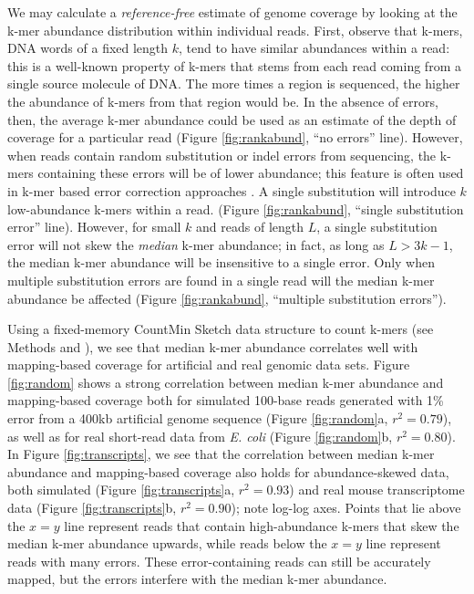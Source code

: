 \documentclass[10pt]{article}
\begin{document}
We may calculate a {\em reference-free} estimate of genome coverage by
looking at the k-mer abundance distribution within individual reads.
First, observe that k-mers, DNA words of a fixed length $k$, tend to
have similar abundances within a read: this is a well-known property
of k-mers that stems from each read coming from a single source
molecule of DNA.  The more times a region is sequenced, the higher the
abundance of k-mers from that region would be.  In the absence of
errors, then, the average k-mer abundance could be used as an estimate
of the depth of coverage for a particular read (Figure
\ref{fig:rankabund}, ``no errors'' line).  However, when reads contain
random substitution or indel errors from sequencing, the k-mers
containing these errors will be of lower abundance; this feature is
often used in k-mer based error correction approaches
\cite{pubmed21114842}.  A single substitution will introduce $k$
low-abundance k-mers within a read.  (Figure \ref{fig:rankabund},
``single substitution error'' line).  However, for small $k$ and reads
of length $L$, a single substitution error will not skew the {\em
  median} k-mer abundance; in fact, as long as $L > 3k-1$, the median
k-mer abundance will be insensitive to a single error.  Only when
multiple substitution errors are found in a single read will the
median k-mer abundance be affected (Figure \ref{fig:rankabund},
``multiple substitution errors'').

Using a fixed-memory CountMin Sketch data structure to count k-mers
(see Methods and \cite{countminsketch}), we see that median k-mer
abundance correlates well with mapping-based coverage for artificial
and real genomic data sets.  Figure \ref{fig:random} shows a strong
correlation between median k-mer abundance and mapping-based coverage
both for simulated 100-base reads generated with 1\% error from a
400kb artificial genome sequence (Figure \ref{fig:random}a, $r^2 =
0.79$), as well as for real short-read data from {\em E. coli} (Figure
\ref{fig:random}b, $r^2 = 0.80$).  In Figure \ref{fig:transcripts}, we
see that the correlation between median k-mer abundance and
mapping-based coverage also holds for abundance-skewed data, both
simulated (Figure \ref{fig:transcripts}a, $r^2 = 0.93$) and real mouse
transcriptome data (Figure \ref{fig:transcripts}b, $r^2 = 0.90$); note
log-log axes.  Points that lie above the $x=y$ line represent reads
that contain high-abundance k-mers that skew the median k-mer
abundance upwards, while reads below the $x=y$ line represent reads
with many errors.  These error-containing reads can still be
accurately mapped, but the errors interfere with the median k-mer
abundance.
\end{document}

